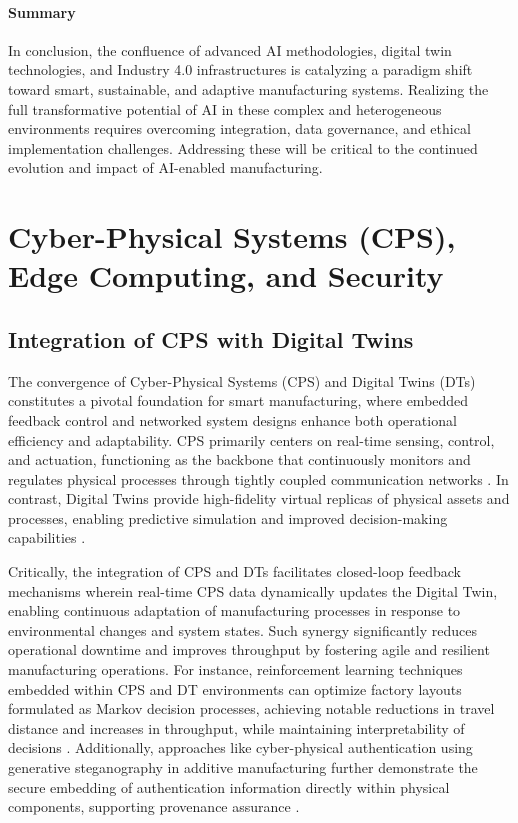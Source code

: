 \documentclass[sigconf]{acmart}
\begin{document}
\paragraph{Summary}

In conclusion, the confluence of advanced AI methodologies, digital twin technologies, and Industry 4.0 infrastructures is catalyzing a paradigm shift toward smart, sustainable, and adaptive manufacturing systems. Realizing the full transformative potential of AI in these complex and heterogeneous environments requires overcoming integration, data governance, and ethical implementation challenges. Addressing these will be critical to the continued evolution and impact of AI-enabled manufacturing.

\section{Cyber-Physical Systems (CPS), Edge Computing, and Security}

\subsection{Integration of CPS with Digital Twins}

The convergence of Cyber-Physical Systems (CPS) and Digital Twins (DTs) constitutes a pivotal foundation for smart manufacturing, where embedded feedback control and networked system designs enhance both operational efficiency and adaptability. CPS primarily centers on real-time sensing, control, and actuation, functioning as the backbone that continuously monitors and regulates physical processes through tightly coupled communication networks \cite{ref9}. In contrast, Digital Twins provide high-fidelity virtual replicas of physical assets and processes, enabling predictive simulation and improved decision-making capabilities \cite{ref12}.

Critically, the integration of CPS and DTs facilitates closed-loop feedback mechanisms wherein real-time CPS data dynamically updates the Digital Twin, enabling continuous adaptation of manufacturing processes in response to environmental changes and system states. Such synergy significantly reduces operational downtime and improves throughput by fostering agile and resilient manufacturing operations. For instance, reinforcement learning techniques embedded within CPS and DT environments can optimize factory layouts formulated as Markov decision processes, achieving notable reductions in travel distance and increases in throughput, while maintaining interpretability of decisions \cite{ref9}. Additionally, approaches like cyber-physical authentication using generative steganography in additive manufacturing further demonstrate the secure embedding of authentication information directly within physical components, supporting provenance assurance \cite{ref10}.
\end{document}
